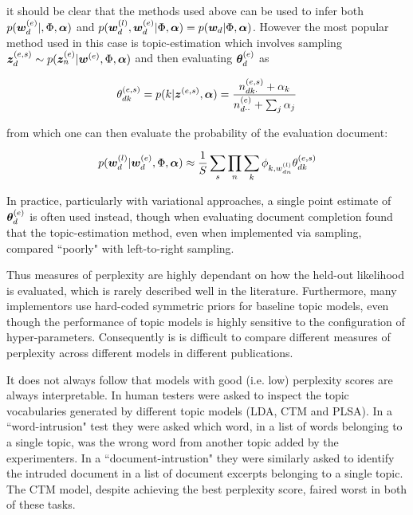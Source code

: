 it should be clear that the methods used above can be used to infer both $p(\bm w_d^{(e)}|, \Phi, \bm \alpha)$ and $p(\bm w_d^{(l)},\bm w_d^{(e)} | \Phi, \bm \alpha) = p(\bm w_d | \Phi, \bm \alpha)$. However the most  popular method used in this case is topic-estimation which involves sampling $\bm z_d^{(e,s)} \sim p(\bm z_n^{(e)} | \bm w^{(e)}, \Phi, \bm \alpha)$ and then evaluating $\bm \theta_d^{(e)}$ as

\begin{align}
\theta^{(e,s)}_{dk} = p(k | \bm z^{(e,s)}, \bm \alpha) = \frac{n^{(e,s)}_{dk\cdot} + \alpha_k}{n^{(e)}_{d\cdot\cdot} + \sum_j \alpha_j}
\end{align}

from which one can then evaluate the probability of the evaluation document:

\begin{align}
p(\bm w_d^{(l)}|\bm w_d^{(e)}, \Phi, \bm \alpha) \approx
\frac{1}{ {S} } \sum_s \prod_n \sum_k \phi_{k,w^{(l)}_{dn}}\theta_{dk}^{(e,s)}
\end{align}

In practice, particularly with variational approaches, a single point estimate of $\bm \theta_d^{(e)}$ is often used instead\cite{Asuncion2012}, though when evaluating document completion \cite{Wallach2009} found that the topic-estimation method, even when implemented via sampling, compared ``poorly" with left-to-right sampling. 

Thus measures of perplexity are highly dependant on how the held-out likelihood is evaluated, which is rarely described well in the literature. Furthermore, many implementors use hard-coded symmetric priors for baseline topic models, even though the performance of topic models is highly sensitive to the configuration of hyper-parameters\cite{Asuncion2012}\cite{Wallach2006}. Consequently is is difficult to compare different measures of perplexity across different models in different publications.

It does not always follow that models with good (i.e. low) perplexity scores are always interpretable. In\cite{Chang2009} human testers were asked to inspect the topic vocabularies generated by different topic models (LDA, CTM and PLSA). In a ``word-intrusion" test they were asked which word, in a list of words belonging to a single topic, was the wrong word from another topic added by the experimenters. In a ``document-intrustion" they were similarly asked to identify the intruded document in a list of document excerpts belonging to a single topic. The CTM model, despite achieving the best perplexity score, faired worst in both of these tasks. 

